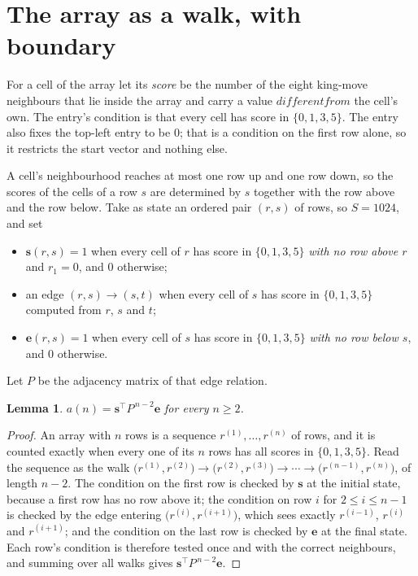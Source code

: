 \documentclass[11pt,a4paper]{article}
\theoremstyle{plain}
\newtheorem{lemma}[theorem]{Lemma}
\theoremstyle{definition}
\begin{document}
\section{The array as a walk, with boundary}

For a cell of the array let its \emph{score} be the number of the eight king-move neighbours that lie inside
the array and carry a value $different from$ the cell's own. The entry's condition is that every cell
has score in $\{0,1,3,5\}$. The entry also fixes the top-left entry to be $0$; that is a condition on the first row alone, so it restricts the start vector and nothing else.

A cell's neighbourhood reaches at most one row up and one row down, so the scores of the
cells of a row $s$ are determined by $s$ together with the row above and the row below.
Take as state an ordered pair $(r,s)$ of rows, so $S=1024$, and set
\begin{itemize}
\item $\mathbf{s}(r,s)=1$ when every cell of $r$ has score in $\{0,1,3,5\}$ \emph{with no row
above $r$} and $r_1=0$, and $0$ otherwise;
\item an edge $(r,s)\to(s,t)$ when every cell of $s$ has score in $\{0,1,3,5\}$ computed from
$r$, $s$ and $t$;
\item $\mathbf{e}(r,s)=1$ when every cell of $s$ has score in $\{0,1,3,5\}$ \emph{with no row
below $s$}, and $0$ otherwise.
\end{itemize}
Let $P$ be the adjacency matrix of that edge relation.

\begin{lemma}\label{lem:walk}
$a(n)=\mathbf{s}^{\!\top}P^{\,n-2}\mathbf{e}$ for every $n\ge2$.
\end{lemma}

\begin{proof}
An array with $n$ rows is a sequence $r^{(1)},\dots,r^{(n)}$ of rows, and it is counted
exactly when every one of its $n$ rows has all scores in $\{0,1,3,5\}$. Read the sequence as the
walk $\bigl(r^{(1)},r^{(2)}\bigr)\to\bigl(r^{(2)},r^{(3)}\bigr)\to\cdots\to
\bigl(r^{(n-1)},r^{(n)}\bigr)$, of length $n-2$. The condition on the first row is
checked by $\mathbf{s}$ at the initial state, because a first row has no row above it; the
condition on row $i$ for $2\le i\le n-1$ is checked by the edge entering
$\bigl(r^{(i)},r^{(i+1)}\bigr)$, which sees exactly $r^{(i-1)}$, $r^{(i)}$ and
$r^{(i+1)}$; and the condition on the last row is checked by $\mathbf{e}$ at the final
state. Each row's condition is therefore tested once and with the correct neighbours, and
summing over all walks gives $\mathbf{s}^{\!\top}P^{\,n-2}\mathbf{e}$.
\end{proof}
\end{document}
